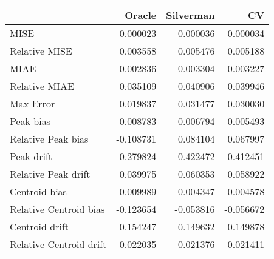 \begin{tabular}{lrrr}
  \hline
 & Oracle & Silverman & CV \\ 
  \hline
MISE & 0.000023 & 0.000036 & 0.000034 \\ 
  Relative MISE & 0.003558 & 0.005476 & 0.005188 \\ 
  MIAE & 0.002836 & 0.003304 & 0.003227 \\ 
  Relative MIAE & 0.035109 & 0.040906 & 0.039946 \\ 
  Max Error & 0.019837 & 0.031477 & 0.030030 \\ 
  Peak bias & -0.008783 & 0.006794 & 0.005493 \\ 
  Relative Peak bias & -0.108731 & 0.084104 & 0.067997 \\ 
  Peak drift & 0.279824 & 0.422472 & 0.412451 \\ 
  Relative Peak drift & 0.039975 & 0.060353 & 0.058922 \\ 
  Centroid bias & -0.009989 & -0.004347 & -0.004578 \\ 
  Relative Centroid bias & -0.123654 & -0.053816 & -0.056672 \\ 
  Centroid drift & 0.154247 & 0.149632 & 0.149878 \\ 
  Relative Centroid drift & 0.022035 & 0.021376 & 0.021411 \\ 
   \hline
\end{tabular}
